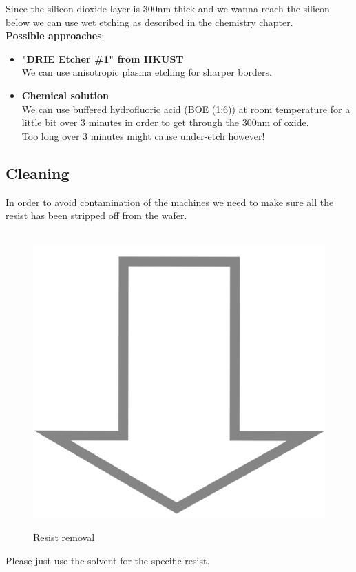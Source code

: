 Since the silicon dioxide layer is 300nm thick and we wanna reach the silicon below we can use wet etching as described in the chemistry chapter.\\

\textbf{Possible approaches}:
\begin{itemize}
	\item \textbf{"DRIE Etcher \#1" from HKUST} \\
	We can use anisotropic plasma etching for sharper borders.
	\item \textbf{Chemical solution} \\
	We can use buffered hydrofluoric acid (BOE (1:6)) at room temperature for a little bit over 3 minutes in order to get through the 300nm of oxide.\\
	Too long over 3 minutes might cause under-etch however!
\end{itemize}

\subsection{Cleaning}
In order to avoid contamination of the machines we need to make sure all the resist has been stripped off from the wafer.
\begin{figure}[H]
	\centering
	\begin{tikzpicture}[node distance = 3cm, auto, thick,scale=\CrossSectionOnly, every node/.style={transform shape}]
		
	\end{tikzpicture} \\
	\includegraphics[scale=0.01]{down_arrow.png} \\
	\begin{tikzpicture}[node distance = 3cm, auto, thick,scale=\CrossSectionOnly, every node/.style={transform shape}]
		
	\end{tikzpicture}
	\caption{Resist removal}
\end{figure}
Please just use the solvent for the specific resist.

